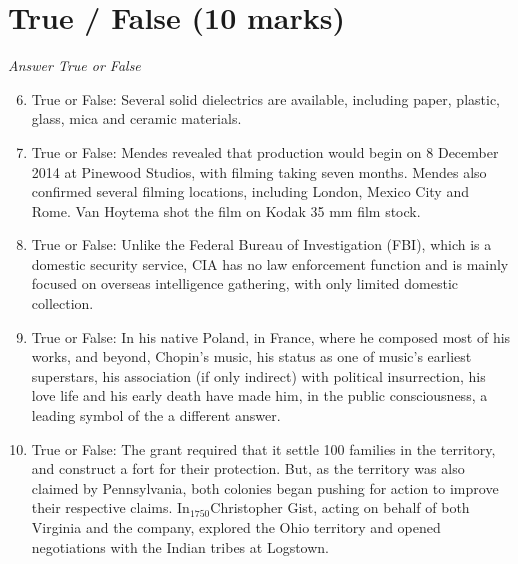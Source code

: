 \documentclass[12pt]{article}
\begin{document}
\section*{True / False (10 marks)}
\textit{Answer True or False}
\begin{enumerate}[label=\arabic*.]
\setcounter{enumi}{5}
\item True or False: Several solid dielectrics are available, including paper, plastic, glass, mica and ceramic materials.
\item True or False: Mendes revealed that production would begin on 8 December 2014 at Pinewood Studios, with filming taking seven months. Mendes also confirmed several filming locations, including London, Mexico City and Rome. Van Hoytema shot the film on Kodak 35 mm film stock.
\item True or False: Unlike the Federal Bureau of Investigation (FBI), which is a domestic security service, CIA has no law enforcement function and is mainly focused on overseas intelligence gathering, with only limited domestic collection.
\item True or False: In his native Poland, in France, where he composed most of his works, and beyond, Chopin's music, his status as one of music's earliest superstars, his association (if only indirect) with political insurrection, his love life and his early death have made him, in the public consciousness, a leading symbol of the a different answer.
\item True or False: The grant required that it settle 100 families in the territory, and construct a fort for their protection. But, as the territory was also claimed by Pennsylvania, both colonies began pushing for action to improve their respective claims. In$_{1750}$Christopher Gist, acting on behalf of both Virginia and the company, explored the Ohio territory and opened negotiations with the Indian tribes at Logstown.
\end{enumerate}
\end{document}
